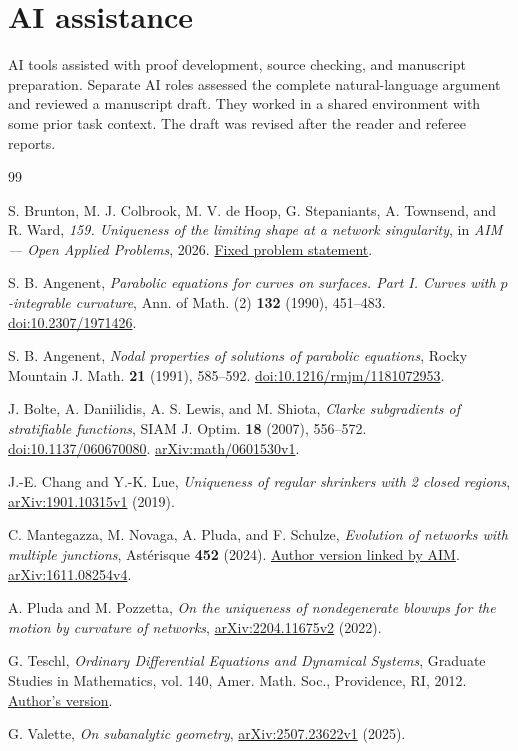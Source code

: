 \documentclass[11pt,reqno]{amsart}
\numberwithin{equation}{section}
\begin{document}


\section*{AI assistance}
AI tools assisted with proof development, source checking, and
manuscript preparation. Separate AI roles assessed the complete
natural-language argument and reviewed a manuscript draft. They
worked in a shared environment with some prior task context. The
draft was revised after the reader and referee reports.

\begin{thebibliography}{99}

S. Brunton, M. J. Colbrook, M. V. de Hoop, G. Stepaniants,
A. Townsend, and R. Ward,
\emph{159. Uniqueness of the limiting shape at a network singularity},
in \emph{AIM --- Open Applied Problems}, 2026.
\href{https://github.com/MColbrook/AIM/blob/b2ec0fac559f532fc0ed04fce81deea0ce07c68b/problems/159-network-tangent-uniqueness.md}{Fixed problem statement}.


S. B. Angenent,
\emph{Parabolic equations for curves on surfaces. Part I. Curves with
\(p\)-integrable curvature},
Ann. of Math. (2) \textbf{132} (1990), 451--483.
\href{https://doi.org/10.2307/1971426}{doi:10.2307/1971426}.

S. B. Angenent,
\emph{Nodal properties of solutions of parabolic equations},
Rocky Mountain J. Math. \textbf{21} (1991), 585--592.
\href{https://doi.org/10.1216/rmjm/1181072953}{doi:10.1216/rmjm/1181072953}.

J. Bolte, A. Daniilidis, A. S. Lewis, and M. Shiota,
\emph{Clarke subgradients of stratifiable functions},
SIAM J. Optim. \textbf{18} (2007), 556--572.
\href{https://doi.org/10.1137/060670080}{doi:10.1137/060670080}.
\href{https://arxiv.org/abs/math/0601530v1}{arXiv:math/0601530v1}.

J.-E. Chang and Y.-K. Lue,
\emph{Uniqueness of regular shrinkers with 2 closed regions},
\href{https://arxiv.org/abs/1901.10315v1}{arXiv:1901.10315v1} (2019).

C. Mantegazza, M. Novaga, A. Pluda, and F. Schulze,
\emph{Evolution of networks with multiple junctions},
Astérisque \textbf{452} (2024).
\href{https://people.dm.unipi.it/novaga/papers/mantegazza/tripunto/network-survey.pdf}{Author version linked by AIM}.
\href{https://arxiv.org/abs/1611.08254v4}{arXiv:1611.08254v4}.

A. Pluda and M. Pozzetta,
\emph{On the uniqueness of nondegenerate blowups for the motion by curvature of networks},
\href{https://arxiv.org/abs/2204.11675v2}{arXiv:2204.11675v2} (2022).

G. Teschl,
\emph{Ordinary Differential Equations and Dynamical Systems},
Graduate Studies in Mathematics, vol. 140, Amer. Math. Soc.,
Providence, RI, 2012.
\href{https://mat.univie.ac.at/~gerald/ftp/book-ode/ode.pdf}{Author's version}.

G. Valette,
\emph{On subanalytic geometry},
\href{https://arxiv.org/abs/2507.23622v1}{arXiv:2507.23622v1} (2025).

\end{thebibliography}
\end{document}

